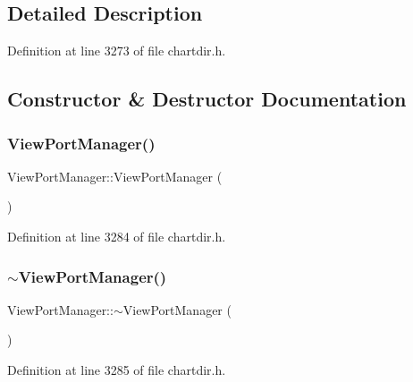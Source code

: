 \subsection{Detailed Description}


Definition at line 3273 of file chartdir.\+h.



\subsection{Constructor \& Destructor Documentation}
\mbox{\label{class_view_port_manager_aa1b652e4a2d4d11c50bcb6070506cc52}} 
\subsubsection{\texorpdfstring{View\+Port\+Manager()}{ViewPortManager()}}
{\footnotesize\ttfamily View\+Port\+Manager\+::\+View\+Port\+Manager (\begin{DoxyParamCaption}{ }\end{DoxyParamCaption})\hspace{0.3cm}{\ttfamily [inline]}}



Definition at line 3284 of file chartdir.\+h.

\mbox{\label{class_view_port_manager_a246382d798570dd477efd4da1946778d}} 
\subsubsection{\texorpdfstring{$\sim$\+View\+Port\+Manager()}{~ViewPortManager()}}
{\footnotesize\ttfamily View\+Port\+Manager\+::$\sim$\+View\+Port\+Manager (\begin{DoxyParamCaption}{ }\end{DoxyParamCaption})\hspace{0.3cm}{\ttfamily [inline]}}



Definition at line 3285 of file chartdir.\+h.


